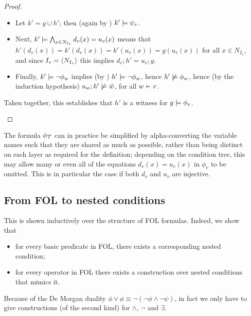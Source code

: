 \begin{proof}
\begin{description}
\begin{itemize}
\item Let $k'=g\cup h'$; then (again by ) $k'\models \psi_v$.

\item Next, $k'\models \bigwedge_{x\in N_{I_v}} d_v(x)=u_v(x)$ means that $h'(d_v(x))=k'(d_v(x))=k'(u_v(x))=g(u_v(x))$ for all $x\in N_{I_v}$, and since $I_v=\langle N_{I_v}\rangle$ this implies $d_v;h'=u_v;g$.

\item Finally, $k'\models \neg\phi_w$ implies (by ) $h'\models\neg\phi_w$, hence $h'\not\models\phi_w$, hence (by the induction hypothesis) $u_w;h'\not\models \hat w$, for all $w\childof v$.
\end{itemize}

Taken together, this establishes that $h'$ is a witness for  $g\models \phi_v$.
\end{description}
\end{proof}
%
The formula $\phi_{\mathcal{T}}$ can in practice be simplified by alpha-converting the variable names such that they are shared as much as possible, rather than being distinct on each layer as required for the definition; depending on the condition tree, this may allow many or even all of the equations $d_v(x)=u_v(x)$ in $\phi_v$ to be omitted. This is in particular the case if both $d_v$ and $u_v$ are injective.

\subsection{From FOL to nested conditions}

This is shown inductively over the structure of FOL formulas. Indeed, we show that
\begin{itemize}
\item for every basic predicate in FOL, there exists a corresponding nested condition;
\item for every operator in FOL there exists a construction over nested conditions that mimics it.
\end{itemize}
%
Because of the De Morgan duality $\phi\vee \phi\equiv \neg(\neg\phi\wedge \neg\psi)$, in fact we only have to give constructions (of the second kind) for $\wedge$, $\neg$ and $\exists$.

